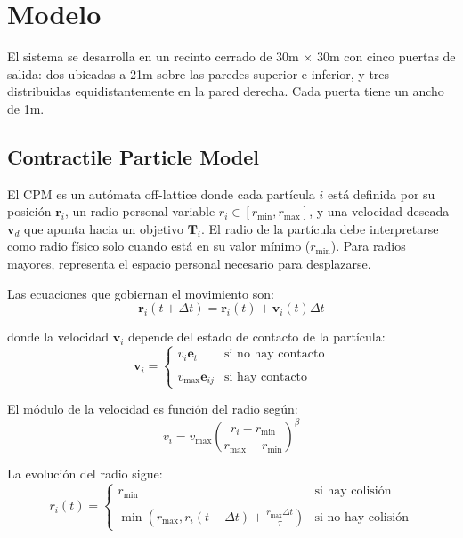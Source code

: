 \documentclass[12pt]{article}
\begin{document}
\section{Modelo}
El sistema se desarrolla en un recinto cerrado de 30m × 30m con cinco puertas de salida: dos ubicadas a 21m sobre las paredes superior e inferior, y tres distribuidas equidistantemente en la pared derecha. Cada puerta tiene un ancho de 1m.

\subsection{Contractile Particle Model}
El CPM es un autómata off-lattice donde cada partícula $i$ está definida por su posición $\mathbf{r}_i$, un radio personal variable $r_i \in [r_{\text{min}}, r_{\text{max}}]$, y una velocidad deseada $\mathbf{v}_d$ que apunta hacia un objetivo $\mathbf{T}_i$. El radio de la partícula debe interpretarse como radio físico solo cuando está en su valor mínimo ($r_{\text{min}}$). Para radios mayores, representa el espacio personal necesario para desplazarse.

Las ecuaciones que gobiernan el movimiento son:
\begin{equation}
\mathbf{r}_i(t + \Delta t) = \mathbf{r}_i(t) + \mathbf{v}_i(t)\Delta t
\end{equation}

donde la velocidad $\mathbf{v}_i$ depende del estado de contacto de la partícula:
\begin{equation}
\mathbf{v}_i = \begin{cases}
v_i\mathbf{e}_t & \text{si no hay contacto} \\\\
v_{\text{max}}\mathbf{e}_{ij} & \text{si hay contacto}
\end{cases}
\end{equation}

El módulo de la velocidad es función del radio según:
\begin{equation}
v_i = v_{\text{max}}\left(\frac{r_i - r_{\text{min}}}{r_{\text{max}} - r_{\text{min}}}\right)^\beta
\end{equation}

La evolución del radio sigue:
\begin{equation}
r_i(t) = \begin{cases}
r_{\text{min}} & \text{si hay colisión} \\\\
\min\left(r_{\text{max}}, r_i(t-\Delta t) + \frac{r_{\text{max}}\Delta t}{\tau}\right) & \text{si no hay colisión}
\end{cases}
\end{equation}
\end{document}
